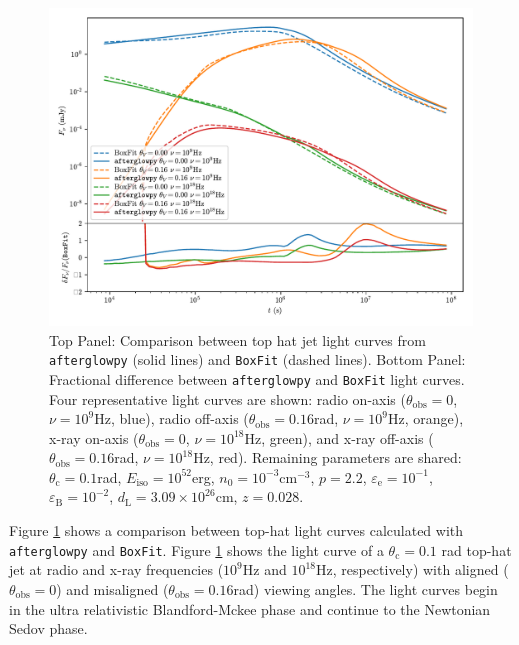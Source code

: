 \documentclass[twocolumn]{aastex62}
\newcommand{\afterglowpy}{{\tt afterglowpy}}
\newcommand{\boxfit}{{\tt BoxFit}}
\newcommand{\thobs}{\ensuremath{\theta_{\mathrm{obs}}}}
\newcommand{\thC}{\ensuremath{\theta_{\mathrm{c}}}}
\newcommand{\epse}{\ensuremath{\varepsilon_{\mathrm{e}}}}
\newcommand{\epsB}{\ensuremath{\varepsilon_{\mathrm{B}}}}
\newcommand{\dL}{\ensuremath{d_{\mathrm{L}}}}
\newcommand{\Eiso}{\ensuremath{E_{\mathrm{iso}}}}
\begin{document}
%
\begin{figure}
	\includegraphics[width=\textwidth]{figs/boxfit_comp.pdf}
	\caption{Top Panel: Comparison between top hat jet light curves from \afterglowpy{} (solid lines) and \boxfit{} (dashed lines). Bottom Panel: Fractional difference between \afterglowpy{} and \boxfit{} light curves.  Four representative light curves are shown: radio on-axis ($\thobs=0$, $\nu=10^9$Hz, blue), radio off-axis ($\thobs=0.16$rad, $\nu=10^9$Hz, orange), x-ray on-axis ($\thobs=0$, $\nu=10^{18}$Hz, green), and x-ray off-axis ($\thobs=0.16$rad, $\nu=10^{18}$Hz, red).  Remaining parameters are shared: $\thC=0.1$rad, $\Eiso=10^{52}$erg, $n_0 = 10^{-3}$cm$^{-3}$, $p=2.2$, $\epse=10^{-1}$, $\epsB=10^{-2}$, $\dL=3.09 \times 10^{26}$cm, $z=0.028$. \label{fig:boxfitComp}}
\end{figure}

Figure \ref{fig:boxfitComp} shows a comparison between top-hat light curves calculated with \afterglowpy{} and \boxfit{}.   Figure \ref{fig:boxfitComp} shows the light curve of a $\thC=0.1$ rad top-hat jet at radio and x-ray frequencies ($10^9$Hz and $10^{18}$Hz, respectively) with aligned ($\thobs = 0$) and misaligned ($\thobs=0.16$rad) viewing angles.  The light curves begin in the ultra relativistic Blandford-Mckee phase and continue to the Newtonian Sedov phase.
\end{document}
